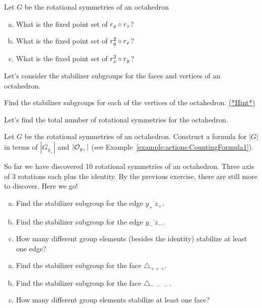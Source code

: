 \begin{exercise}\label{exercise:actions:Octa5}
Let $G$ be the rotational symmetries of an octahedron
\begin{enumerate}[(a)]
\item  What is the fixed point set of $r_{y}\circ r_{z}$?
\item What is the fixed point set of $r_{y}^2\circ r_{x}$? 
\item What is the fixed point set of $r_{x}^2\circ r_{y}$?
\end{enumerate}
\end{exercise}

Let's consider the stabilizer subgroups for the faces and vertices of an octahedron.  
 
\begin{exercise}\label{exercise:actions:Octa5a}
Find the stabilizer subgroups for each of the vertices of the octahedron. 
\hyperref[sec:actions:hints]{(*Hint*)}
\end{exercise}

Let's find the total number of rotational symmetries for the octahedron. 

\begin{exercise}\label{exercise:actions:Octa6} 
Let $G$ be the rotational symmetries of an octahedron. Construct a formula for $|G|$ in terms of $| G_{y_+}|$ and $|{\cal O}_{y_+}|$ (see Example~\ref{example:actions:CountingFormula1}).
 \end{exercise}

So far we have discovered 10 rotational symmetries of an octahedron.  Three axis of 3 rotations each plus the identity.  By the previous exercise, there are still more to discover.  Here we go! 

\begin{exercise}\label{exercise:actions:Octa7}
\begin{enumerate}[(a)]
\item Find the stabilizer subgroup for the edge $\overline{y_+~z_+}$. 
\item Find the stabilizer subgroup for the edge $\overline{y_-~z_-}$.
\item How many different group elements (besides the identity) stabilize at least one edge?
\end{enumerate}
\end{exercise}	

\begin{exercise}\label{exercise:actions:Octa8}
\begin{enumerate}[(a)]
\item Find the stabilizer subgroup for the face $\triangle_{+ + +}$.
\item Find the stabilizer subgroup for the face $\triangle_{ -~-~-}$.
\item How many different group elements stabilize at least one face?
\end{enumerate}
\end{exercise}

